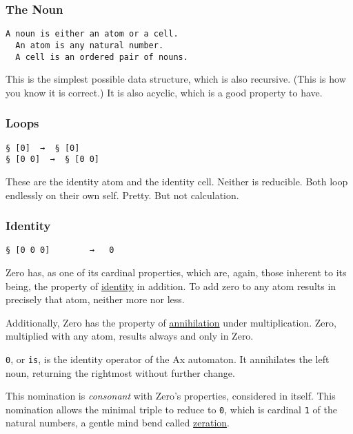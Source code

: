 \documentclass[twoside]{article}
\begin{document}
\subsubsection{The Noun}

\begin{lstlisting}[style=listingblock]
  A noun is either an atom or a cell.
  An atom is any natural number.
  A cell is an ordered pair of nouns.
\end{lstlisting}

This is the simplest possible data structure, which is also recursive.  (This is how you know it is correct.)  It is also acyclic, which is a good property to have.

\subsubsection{Loops}

\begin{lstlisting}[style=listingcode]
§ [0]  →  § [0]
§ [0 0]  →  § [0 0]
\end{lstlisting}

\noindent
These are the identity atom and the identity cell.  Neither is reducible. Both loop endlessly on their own self.  Pretty. But not calculation.

\subsubsection{Identity}

\begin{lstlisting}[style=listingcode]
§ [0 0 0]        →   0
\end{lstlisting}

\noindent
Zero has, as one of its cardinal properties, which are, again, those inherent to its being, the property of \href{https://en.wikipedia.org/wiki/Identity_function}{identity} in addition. To add zero to any atom results in precisely that atom, neither more nor less.

Additionally, Zero has the property of \href{https://en.wikipedia.org/wiki/Absorbing_element}{annihilation} under multiplication. Zero, multiplied with any atom, results always and only in Zero.

\texttt{0}, or \texttt{is}, is the identity operator of the Ax automaton. It annihilates the left noun, returning the rightmost without further change.

This nomination is \emph{consonant} with Zero's properties, considered in itself. This nomination allows the minimal triple to reduce to \texttt{0}, which is cardinal \texttt{1} of the natural numbers, a gentle mind bend called \href{https://en.wikipedia.org/wiki/Successor_function}{zeration}.
\end{document}
